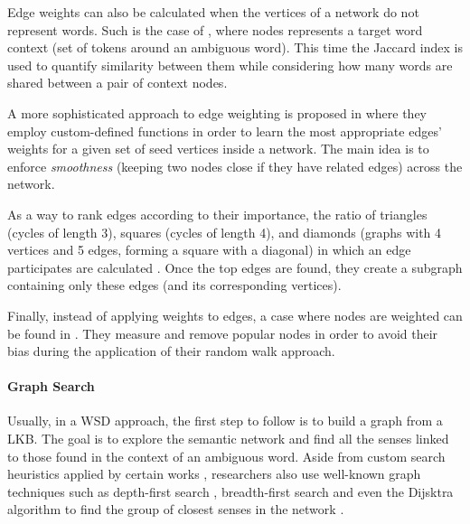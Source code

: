 Edge weights can also be calculated when the vertices of a network do not represent words. Such is the case of \cite{2010.Klapaftis.WSD.WSD.HierarchicalGraphs}, where nodes represents a target word context (set of tokens around an ambiguous word). This time the Jaccard index is used to quantify similarity between them while considering how many words are shared between a pair of context nodes.


A  more sophisticated approach to edge weighting is proposed in \cite{2013.Saluja.Graph-BasedUnsupervisedLearning} where they employ  custom-defined functions in order to learn the most appropriate edges' weights for a given set of seed vertices inside a network. The main idea  is to enforce \textit{smoothness} (keeping two nodes close if they have related edges) across the network.

As a way to rank edges according to their importance, the ratio of triangles (cycles of length 3), squares (cycles of length 4), and diamonds (graphs with 4 vertices and 5 edges, forming a square with a diagonal) in which an edge participates are calculated \cite{2010.Navigli.InducingWordSenses.Triangles,2013.DiMarco.Navigli.ClusteringGraph-BasedWSI}. Once the top edges are found, they create a subgraph containing only these edges (and its corresponding vertices).

Finally, instead of applying weights to edges, a case where  nodes are weighted can be found in \cite{2013.Kivimaki.AGraph-BasedApproach}. They measure and remove popular nodes in order to avoid their bias during the application of their random walk approach.




 

\paragraph{Graph Search}
Usually, in a WSD approach, the first step to follow is to build a graph from a LKB. The goal is to explore the semantic network and find all the senses linked to  those found in the context of an ambiguous word. Aside from custom search heuristics applied by certain works \cite{2006.Agirre.TwoGraph-basedAlgorithms,2007.Sinha.Mihalcea.Unsupervised,2009.Agirre.PersonalizedPageRankWSD}, researchers also use well-known graph techniques such as depth-first search \cite{2007.Navigli.GraphConnectivity}, breadth-first search \cite{2008.Agirre.Multilingual} and even the Dijsktra  algorithm to find the group of closest senses in the network \cite{2013.Matuschek.Gurevych.Dijsktra.WSA}.


